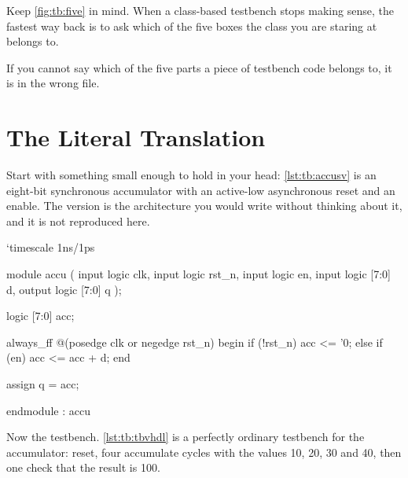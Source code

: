Keep \cref{fig:tb:five} in mind. When a class-based testbench stops making
sense, the fastest way back is to ask which of the five boxes the class you
are staring at belongs to.

\begin{ruleofthumb}
If you cannot say which of the five parts a piece of testbench code belongs
to, it is in the wrong file.
\end{ruleofthumb}

\section{The Literal Translation}
\label{sec:tb:literal}

Start with something small enough to hold in your head:
\cref{lst:tb:accusv} is an eight-bit synchronous accumulator with an
active-low asynchronous reset and an enable. The \VHDL{} version is the
architecture you would write without thinking about it, and it is not
reproduced here.

\begin{svcode}[caption={An eight-bit accumulator, the DUT for this section},label={lst:tb:accusv}]
`timescale 1ns/1ps

module accu (
  input  logic       clk,
  input  logic       rst_n,
  input  logic       en,
  input  logic [7:0] d,
  output logic [7:0] q
);

  logic [7:0] acc;

  always_ff @(posedge clk or negedge rst_n) begin
    if (!rst_n)   acc <= '0;
    else if (en)  acc <= acc + d;
  end

  assign q = acc;

endmodule : accu
\end{svcode}

Now the testbench. \cref{lst:tb:tbvhdl} is a perfectly ordinary \VHDL{}
testbench for the \VHDL{} accumulator: reset, four accumulate cycles with the
values 10, 20, 30 and 40, then one check that the result is 100.


